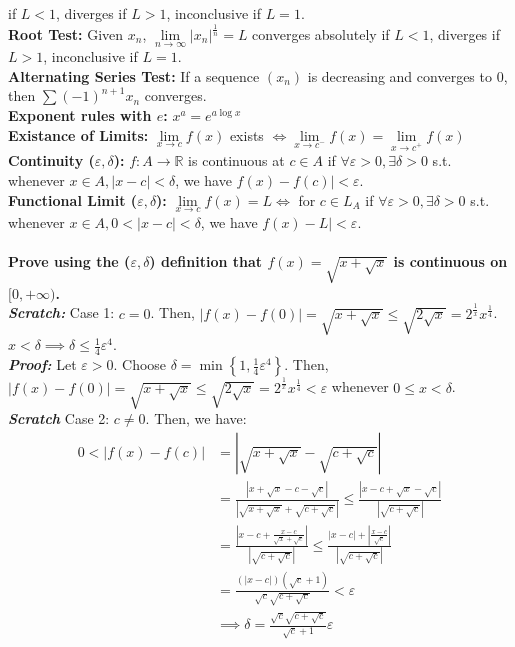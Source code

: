 \documentclass{letter}
\begin{document}
if $L < 1$, diverges if $L > 1$, inconclusive if $L = 1$. \\
\textbf{Root Test:} Given $x_n$, $\lim\limits_{n \to \infty}
\left|x_n\right|^{\frac{1}{n}} = L$ converges absolutely if $L < 1$, diverges if
  $L > 1$, inconclusive if $L = 1$. \\
\textbf{Alternating Series Test:} If a sequence $(x_n)$ is decreasing
and converges to 0, then $\sum (-1)^{n + 1} x_n$ converges. \\
\textbf{Exponent rules with $e$:} $x^a = e^{a \log x}$ \\
\textbf{Existance of Limits:} $\lim\limits_{x \to c} f(x)$ exists
$\iff \lim\limits_{x \to c^-} f(x) = \lim\limits_{x \to c^+} f(x)$ \\
\textbf{Continuity ($\varepsilon, \delta$):} $f: A \to \mathbb{R}$ is
continuous at $c \in A$ if $\forall \varepsilon > 0, \exists \delta >
0$ s.t. whenever $x \in A, |x - c| < \delta$, we have $f(x) - f(c)| <
\varepsilon$. \\
\textbf{Functional Limit ($\varepsilon, \delta$):} $\lim\limits_{x \to
  c} f(x) = L \iff $ for $c \in L_A$ if $\forall \varepsilon > 0,
\exists \delta > 0$ s.t. whenever $x \in A, 0 < |x - c| < \delta$, we
have $f(x) - L| < \varepsilon$. \\ \\
\textbf{Prove using the ($\varepsilon, \delta$) definition that $f(x) =
\sqrt{x + \sqrt{x}}$ is continuous on $[0, +\infty)$.} \\
\textit{\textbf{Scratch:}} Case 1: $c = 0$. Then, $|f(x) - f(0)| =
\sqrt{x + \sqrt{x}} \leq \sqrt{2\sqrt{x}} =
2^{\frac{1}{x}}x^{\frac{1}{4}}$. $x < \delta \implies \delta \leq
\frac{1}{4}\varepsilon^4$. \\
\textit{\textbf{Proof:}} Let $\varepsilon > 0$. Choose $\delta =
\min{\left\{1, \frac{1}{4}\varepsilon^4\right\}}$. Then, $|f(x) - f(0)| =
\sqrt{x + \sqrt{x}} \leq \sqrt{2\sqrt{x}} =
2^{\frac{1}{x}}x^{\frac{1}{4}} < \varepsilon$ whenever $0 \leq x <
\delta$. \\
\textit{\textbf{Scratch}} Case 2: $c \neq 0$. Then, we have:
\begin{align*}
  0 < |f(x) - f(c)|
  &= \left|\sqrt{x + \sqrt{x}} - \sqrt{c + \sqrt{c}}\right| \\
  &= \frac{|x + \sqrt{x} - c - \sqrt{c}|}{|\sqrt{x + \sqrt{x}} + \sqrt{c + \sqrt{c}}|}
    \leq \frac{|x  - c + \sqrt{x} - \sqrt{c}|}{|\sqrt{c + \sqrt{c}}|} \\
  &= \frac{|x - c + \frac{x - c}{\sqrt{x} + \sqrt{c}}|}{|\sqrt{c + \sqrt{c}}|}
     \leq \frac{\left|x - c\right| + \left|\frac{x - c}{\sqrt{c}}\right|}{|\sqrt{c + \sqrt{c}}|} \\
  &= \frac{\left(|x - c|\right)\left(\sqrt{c} + 1\right)}{\sqrt{c}\sqrt{c + \sqrt{c}}} < \varepsilon \\
  &\implies \delta = \frac{\sqrt{c}\sqrt{c + \sqrt{c}}}{\sqrt{c} + 1}\varepsilon 
\end{align*}
\end{document}
